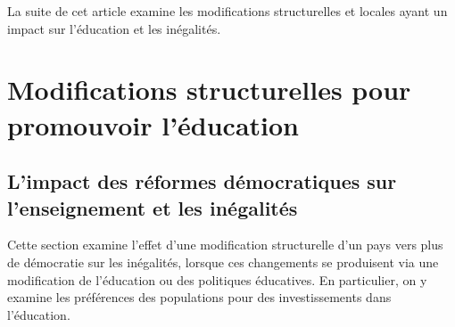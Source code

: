 \documentclass[pagesize, twoside=off, bibliography=totoc, DIV=calc, fontsize=12pt, a4paper, french]{scrartcl}
\begin{document}
La suite de cet article examine les modifications structurelles et locales ayant un impact sur l’éducation et les inégalités.

\section{Modifications structurelles pour promouvoir l’éducation}

\label{sec_struc}

\subsection{L’impact des réformes démocratiques sur l’enseignement et les inégalités}

Cette section examine l’effet d’une modification structurelle d’un pays vers plus de démocratie sur les inégalités, lorsque ces changements se produisent via une modification de l’éducation ou des politiques éducatives.
En particulier, on y examine les préférences des populations pour des investissements dans l’éducation.
\end{document}
